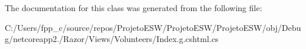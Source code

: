 The documentation for this class was generated from the following file\+:\begin{DoxyCompactItemize}
\item 
C\+:/\+Users/fpp\+\_\+c/source/repos/\+Projeto\+E\+S\+W/\+Projeto\+E\+S\+W/\+Projeto\+E\+S\+W/obj/\+Debug/netcoreapp2./\+Razor/\+Views/\+Volunteers/Index.\+g.\+cshtml.\+cs\end{DoxyCompactItemize}
